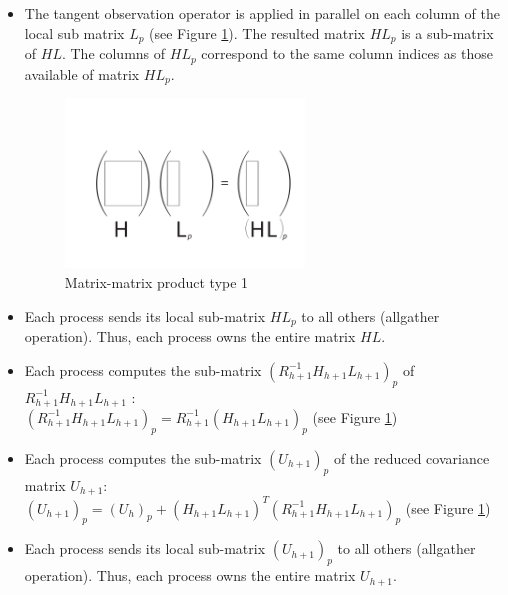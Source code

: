   \begin{itemize}

\item The tangent observation operator is applied in parallel on each column of the local sub matrix $L_p$ (see Figure \ref{matrix_1}). The resulted matrix $HL_p$ is a sub-matrix of $HL$. The columns of $HL_p$ correspond to the same column indices as those available of matrix $HL_p$.

\begin{figure}[htpb]
        \includegraphics[width=0.6\textwidth]{figure/p92.pdf}
        \caption{Matrix-matrix product type 1}
        \label{matrix_1}
\end{figure}


\item Each process sends its local sub-matrix $HL_p$ to all others (allgather operation). Thus, each process owns the entire matrix  $HL$.\\

\item Each process computes the sub-matrix  $(R_{h+1}^{-1} H_{h+1}L_{h+1})_p$ of  $R_{h+1}^{-1} H_{h+1}L_{h+1}$ :\\
$(R_{h+1}^{-1} H_{h+1}L_{h+1})_p = R_{h+1}^{-1} (H_{h+1}L_{h+1})_p$ (see Figure \ref{matrix_1})

\item Each process computes the sub-matrix   $(U_{h+1})_p$  of  the reduced covariance matrix $U_{h+1}$:\\
 $ (U_{h+1})_p = (U_h)_p +  (H_{h+1}L_{h+1})^T (R_{h+1}^{-1} H_{h+1}L_{h+1})_p$ (see Figure \ref{matrix_1})

 \item Each process sends its local sub-matrix  $ (U_{h+1})_p$ to all others (allgather operation). Thus, each process owns the entire matrix  $U_{h+1}$.\\

\end{itemize}



